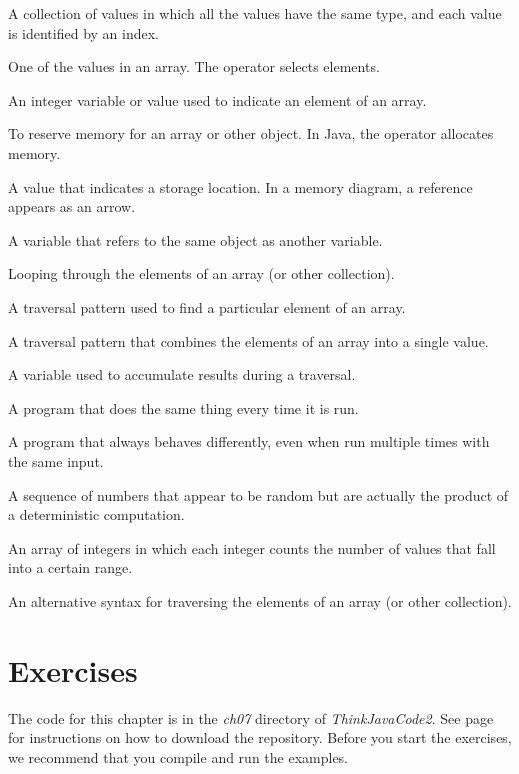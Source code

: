 \begin{description}

A collection of values in which all the values have the same type, and each value is identified by an index.

One of the values in an array.
The \java{[]} operator selects elements.

An integer variable or value used to indicate an element of an array.

To reserve memory for an array or other object.
In Java, the  operator allocates memory.

A value that indicates a storage location.
In a memory diagram, a reference appears as an arrow.

A variable that refers to the same object as another variable.

Looping through the elements of an array (or other collection).

A traversal pattern used to find a particular element of an array.

A traversal pattern that combines the elements of an array into a single value.

A variable used to accumulate results during a traversal.

A program that does the same thing every time it is run.

A program that always behaves differently, even when run multiple times with the same input.

A sequence of numbers that appear to be random but are actually the product of a deterministic computation.

An array of integers in which each integer counts the number of values that fall into a certain range.

An alternative syntax for traversing the elements of an array (or other collection).

\end{description}


\section{Exercises}

The code for this chapter is in the {\it ch07} directory of {\it ThinkJavaCode2}.
See page~\pageref{code} for instructions on how to download the repository.
Before you start the exercises, we recommend that you compile and run the examples.

